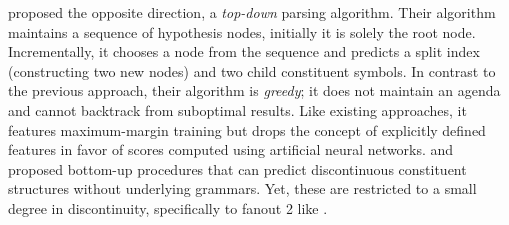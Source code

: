 \documentclass[../document.tex]{subfiles}
\begin{document}
     proposed the opposite direction, a \emph{top-down} parsing algorithm.
        Their algorithm maintains a sequence of hypothesis nodes, initially it is solely the root node.
        Incrementally, it chooses a node from the sequence and predicts a split index (constructing two new nodes) and two child constituent symbols.
    In contrast to the previous approach, their algorithm is \emph{greedy}; it does not maintain an agenda and cannot backtrack from suboptimal results.
    Like existing approaches, it features maximum-margin training but drops the concept of explicitly defined features in favor of scores computed using artificial neural networks.
     and \citet{StaSte20} proposed bottom-up procedures that can predict discontinuous constituent structures without underlying grammars.
    Yet, these are restricted to a small degree in discontinuity, specifically to fanout 2 like .
\end{document}
